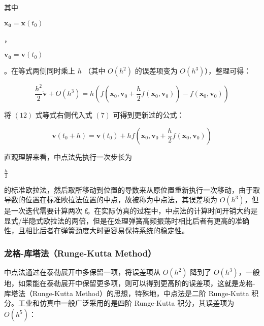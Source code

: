 \documentclass[UTF8]{ctexart}
\begin{document}
其中 \begin{large} $\mathbf{x_0} = \mathbf{x}(t_0)$ \end{large}，\begin{large} $\mathbf{v_0} = \mathbf{v}(t_0)$ \end{large}。在等式两侧同时乘上 $h$ （其中 $O(h^2)$ 的误差项变为 $O(h^3)$），整理可得：

\begin{large}
\begin{equation}
\frac{h^2}{2} \ddot{\mathbf{v}} + O(h^3) = h(f(\mathbf{x}_0, \mathbf{v}_0 + \frac{h}{2} f(\mathbf{x}_0, \mathbf{v}_0)) - f(\mathbf{x}_0, \mathbf{v}_0))
\end{equation}
\end{large}

将 $(12)$ 式等式右侧代入式 $(7)$ 可得到更新过的公式：

\begin{large}
\begin{equation}
\mathbf{v}(t_0 + h) = \mathbf{v}(t_0) + hf(\mathbf{x}_0, \mathbf{v}_0 + \frac{h}{2} f(\mathbf{x}_0, \mathbf{v}_0))
\end{equation}
\end{large}

直观理解来看，中点法先执行一次步长为\begin{large} $\frac{h}{2}$\end{large}的标准欧拉法，然后取所移动到位置的导数来从原位置重新执行一次移动，由于取导数的位置在标准欧拉法位置的中点，故被称为中点法，其误差项为 $O(h^3)$，但是一次迭代需要计算两次 $\mathbf{f}$。在实际仿真的过程中，中点法的计算时间开销大约是显式/半隐式欧拉法的两倍，但是在处理弹簧高频振荡时相比后者有更高的准确性，且相比后者在弹簧劲度大时更容易保持系统的稳定性。

\subsubsection{龙格-库塔法（Runge-Kutta Method）}

中点法通过在泰勒展开中多保留一项，将误差项从 $O(h^2)$ 降到了 $O(h^3)$，一般地，如果能在泰勒展开中保留更多项，则可以得到更高阶的误差项，这就是龙格-库塔法（Runge-Kutta Method）的思想，特殊地，中点法是二阶 Runge-Kutta 积分。工业和仿真中一般广泛采用的是四阶 Runge-Kutta 积分，其误差项为 $O(h^5)$：
\end{document}
